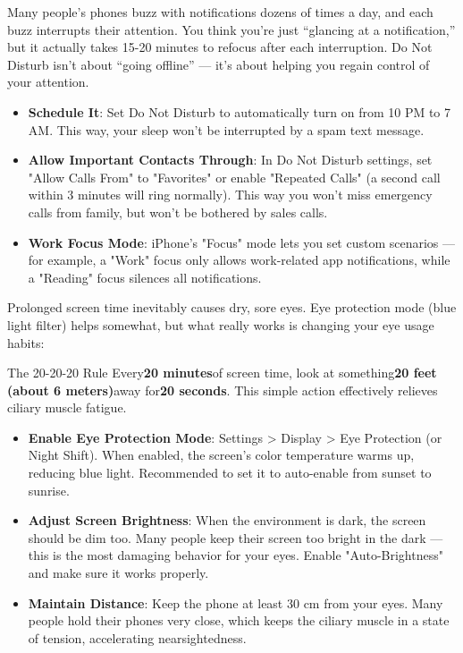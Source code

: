 
Many people's phones buzz with notifications dozens of times a day, and each buzz interrupts their attention. You think you're just “glancing at a notification,” but it actually takes 15-20 minutes to refocus after each interruption. Do Not Disturb isn't about “going offline” — it's about helping you regain control of your attention.

\begin{itemize}
  \item \textbf{Schedule It}: Set Do Not Disturb to automatically turn on from 10 PM to 7 AM. This way, your sleep won't be interrupted by a spam text message.
  \item \textbf{Allow Important Contacts Through}: In Do Not Disturb settings, set "Allow Calls From" to "Favorites" or enable "Repeated Calls" (a second call within 3 minutes will ring normally). This way you won't miss emergency calls from family, but won't be bothered by sales calls.
  \item \textbf{Work Focus Mode}: iPhone's "Focus" mode lets you set custom scenarios — for example, a "Work" focus only allows work-related app notifications, while a "Reading" focus silences all notifications.
\end{itemize}


Prolonged screen time inevitably causes dry, sore eyes. Eye protection mode (blue light filter) helps somewhat, but what really works is changing your eye usage habits:

\begin{tcbinfo}{The 20-20-20 Rule}
Every\textbf{20 minutes}of screen time, look at something\textbf{20 feet (about 6 meters)}away for\textbf{20 seconds}. This simple action effectively relieves ciliary muscle fatigue.

\end{tcbinfo}

\begin{itemize}
  \item \textbf{Enable Eye Protection Mode}: Settings > Display > Eye Protection (or Night Shift). When enabled, the screen's color temperature warms up, reducing blue light. Recommended to set it to auto-enable from sunset to sunrise.
  \item \textbf{Adjust Screen Brightness}: When the environment is dark, the screen should be dim too. Many people keep their screen too bright in the dark — this is the most damaging behavior for your eyes. Enable "Auto-Brightness" and make sure it works properly.
  \item \textbf{Maintain Distance}: Keep the phone at least 30 cm from your eyes. Many people hold their phones very close, which keeps the ciliary muscle in a state of tension, accelerating nearsightedness.
\end{itemize}

